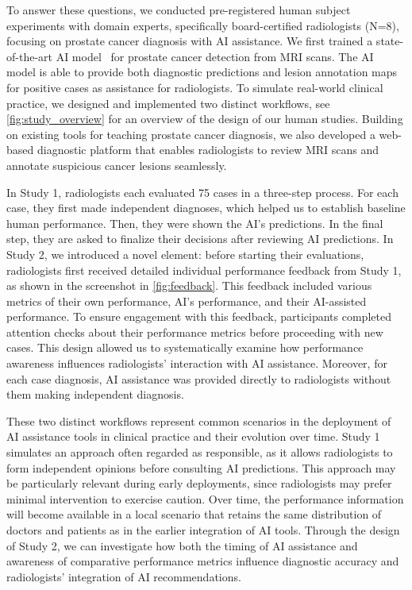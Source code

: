  
To answer these questions, we conducted pre-registered human subject experiments with domain experts, specifically board-certified radiologists (N=8), focusing on prostate cancer diagnosis with AI assistance.
We first trained a state-of-the-art AI model~\cite{isensee2021nnu} for prostate cancer detection from MRI scans.
The AI model is able to provide both diagnostic predictions and lesion annotation maps for positive cases as assistance for radiologists. 
To simulate real-world clinical practice, we designed and implemented two distinct workflows, see \cref{fig:study_overview} for an overview of the design of our human studies. 
Building on existing tools for teaching prostate cancer diagnosis, we also developed a web-based diagnostic platform that enables radiologists to review MRI scans and annotate suspicious cancer lesions seamlessly. 

In Study 1, radiologists each evaluated 75 cases in a three-step process.
For each case, they first made independent diagnoses, which helped us to establish baseline human performance.
Then, they were shown the AI's predictions. In the final step, they are asked to finalize their decisions after reviewing AI predictions.
In Study 2, we introduced a novel element: before starting their evaluations, radiologists first received detailed individual performance feedback from Study 1, as shown in the screenshot in \cref{fig:feedback}.
This feedback included various metrics of their own performance, AI's performance, and their AI-assisted performance. 
To ensure engagement with this feedback, participants completed attention checks about their performance metrics before proceeding with new cases. This design allowed us to systematically examine how performance awareness influences radiologists' interaction with AI assistance.
Moreover, for each case diagnosis, AI assistance was provided directly to radiologists without them making independent diagnosis. 

These two distinct workflows represent common scenarios in the deployment of AI assistance tools in clinical practice and their evolution over time. 
Study 1 simulates an approach often regarded as responsible, as it allows radiologists to form independent opinions before consulting AI predictions. 
This approach may be particularly relevant during early deployments,
since radiologists may prefer minimal intervention to exercise caution.
Over time, the performance information will become available in a local scenario that retains the same distribution of doctors and patients as in the earlier integration of AI tools. 
Through the design of Study 2, we can investigate how both the timing of AI assistance and awareness of comparative performance metrics influence diagnostic accuracy and radiologists' integration of AI recommendations. 


